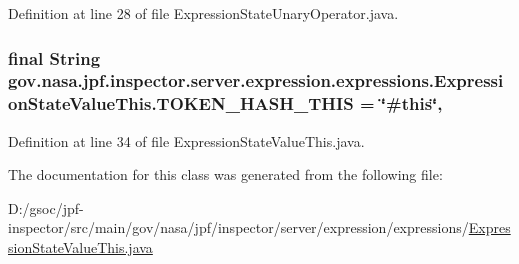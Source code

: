 Definition at line 28 of file Expression\+State\+Unary\+Operator.\+java.

\subsubsection[{\texorpdfstring{T\+O\+K\+E\+N\+\_\+\+H\+A\+S\+H\+\_\+\+T\+H\+IS}{TOKEN_HASH_THIS}}]{\setlength{\rightskip}{0pt plus 5cm}final String gov.\+nasa.\+jpf.\+inspector.\+server.\+expression.\+expressions.\+Expression\+State\+Value\+This.\+T\+O\+K\+E\+N\+\_\+\+H\+A\+S\+H\+\_\+\+T\+H\+IS = \char`\"{}\#this\char`\"{}\hspace{0.3cm}{\ttfamily [static]}, {\ttfamily [private]}}\hypertarget{classgov_1_1nasa_1_1jpf_1_1inspector_1_1server_1_1expression_1_1expressions_1_1_expression_state_value_this_a8b028a2a41eeb9c7f8a338a231a45f6e}{}\label{classgov_1_1nasa_1_1jpf_1_1inspector_1_1server_1_1expression_1_1expressions_1_1_expression_state_value_this_a8b028a2a41eeb9c7f8a338a231a45f6e}


Definition at line 34 of file Expression\+State\+Value\+This.\+java.



The documentation for this class was generated from the following file\+:\begin{DoxyCompactItemize}
\item 
D\+:/gsoc/jpf-\/inspector/src/main/gov/nasa/jpf/inspector/server/expression/expressions/\hyperlink{_expression_state_value_this_8java}{Expression\+State\+Value\+This.\+java}\end{DoxyCompactItemize}
